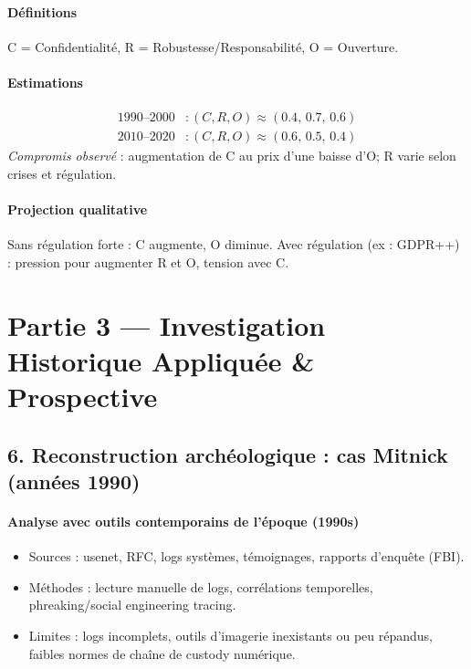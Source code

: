\documentclass[11pt,a4paper]{article}
\begin{document}
\paragraph{Définitions}
C = Confidentialité, R = Robustesse/Responsabilité, O = Ouverture.

\paragraph{Estimations}
\[
\begin{aligned}
1990\text{--}2000 &: (C,R,O) \approx (0.4,\,0.7,\,0.6)\\
2010\text{--}2020 &: (C,R,O) \approx (0.6,\,0.5,\,0.4)
\end{aligned}
\]
\textit{Compromis observé} : augmentation de C au prix d'une baisse d'O; R varie selon crises et régulation.

\paragraph{Projection qualitative}
Sans régulation forte : C augmente, O diminue. Avec régulation (ex : GDPR++) : pression pour augmenter R et O, tension avec C.

\section{Partie 3 — Investigation Historique Appliquée \& Prospective}

\subsection{6. Reconstruction archéologique : cas Mitnick (années 1990)}

\paragraph{Analyse avec outils contemporains de l'époque (1990s)}
\begin{itemize}[noitemsep]
  \item Sources : usenet, RFC, logs systèmes, témoignages, rapports d'enquête (FBI).
  \item Méthodes : lecture manuelle de logs, corrélations temporelles, phreaking/social engineering tracing.
  \item Limites : logs incomplets, outils d'imagerie inexistants ou peu répandus, faibles normes de chaîne de custody numérique.
\end{itemize}
\end{document}
